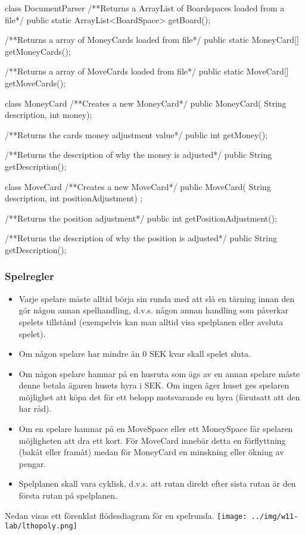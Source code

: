 \begin{JavaSpec}{class DocumentParser}
	/**Returns a ArrayList of Boardspaces loaded from a file*/
	public static ArrayList<BoardSpace> getBoard();

	/**Returns a array of MoneyCards loaded from file*/
	public static MoneyCard[] getMoneyCards();

	/**Returns a array of MoveCards loaded from file*/
	public static MoveCard[] getMoveCards();
\end{JavaSpec}

\begin{JavaSpec}{class MoneyCard}
    /**Creates a new MoneyCard*/
    public MoneyCard( String description, int money);

    /**Returns the cards money adjustment value*/
    public int getMoney();

    /**Returns the description of why the money is adjusted*/ 
    public String getDescription();
\end{JavaSpec}

\begin{JavaSpec}{class MoveCard}
    /**Creates a new MoveCard*/
    public MoveCard( String description, int positionAdjustment) ;

    /**Returns the position adjustment*/
    public int getPositionAdjustment();

    /**Returns the description of why the position is adjusted*/
    public String getDescription();

\end{JavaSpec}

\subsubsection{Spelregler}

\begin{itemize}
\item Varje spelare måste alltid börja sin runda med att slå en tärning innan den gör någon annan spelhandling, d.v.s. någon annan handling som påverkar spelets tillstånd (exempelvis kan man alltid visa spelplanen eller avsluta spelet).
\item Om någon spelare har mindre än 0 SEK kvar skall spelet sluta.
\item Om någon spelare hamnar på en husruta som ägs av en annan spelare måste denne betala ägaren husets hyra i SEK. Om ingen äger huset ges spelaren möjlighet att köpa det för ett belopp motsvarande en hyra (förutsatt att den har råd).
\item Om en spelare hamnar på en MoveSpace eller ett MoneySpace får spelaren möjligheten att dra ett kort. För MoveCard innebär detta en förflyttning (bakåt eller framåt) medan för MoneyCard en minskning eller ökning av pengar.
\item Spelplanen skall vara cyklisk, d.v.s. att rutan direkt efter sista rutan är den första rutan på spelplanen.
\end{itemize}
Nedan visas ett förenklat flödesdiagram för en spelrunda.
\newline
\texttt{[image: ../img/w11-lab/lthopoly.png]}

